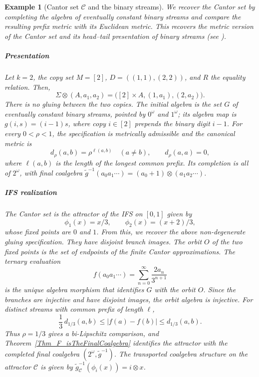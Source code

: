 \documentclass{sn-jnl}%
\theoremstyle{thmstyleone}%
\theoremstyle{thmstyletwo}%
\newtheorem{example}{Example}%
\theoremstyle{thmstylethree}%
\newcommand{\M}{\Sigma}
\newcommand{\F}{\M\otimes}
\newcommand{\g}{\tilde{g}^{-1}}
\newcommand{\f}{\phi}
\begin{document}
\begin{example}[Cantor set $\mathcal C$ and the binary streams]
\label{Ex_CantorSet}
    We recover the Cantor set by completing the algebra of eventually constant binary streams and compare the resulting prefix metric with its Euclidean metric. This recovers the metric version of the Cantor set and its head--tail presentation of binary streams (see \cite[Example~10.1]{Lein}).

    \subparagraph{Presentation}  Let $k=2$, the copy set $M=[2]$, $D=((1,1),(2,2))$, and $R$ the equality relation. Then,
    \begin{equation} 
    \nonumber
        \F(A,a_1,a_2) = \bigl([2]\times A,(1,a_1),(2,a_2)\bigr).
    \end{equation}
    There is no gluing between the two copies. The initial algebra is the set $G$ of eventually constant binary streams, pointed by $0^\omega$ and $1^\omega$; its algebra map is $g(i,s)=(i-1)s$, where copy $i\in[2]$ prepends the binary digit $i-1$. For every $0<\rho<1$, the specification is metrically admissible and the canonical metric is
    \begin{equation} 
    \nonumber
        d_\rho(a,b)=\rho^{\ell(a,b)}\quad(a\ne b), \qquad d_\rho(a,a)=0,
    \end{equation}
    where $\ell(a,b)$ is the length of the longest common prefix.     Its completion is all of $2^\omega$, with final coalgebra $\g(a_0a_1\cdots)=(a_0+1)\otimes(a_1a_2\cdots)$.
    
    \subparagraph{IFS realization} The Cantor set is the attractor of the IFS on $[0,1]$ given by 
    \begin{equation} 
    \nonumber
        \f_1(x)=x/3,\qquad \f_2(x)=(x+2)/3,
    \end{equation}
    whose fixed points are $0$ and $1$. From this, we recover the above non-degenerate gluing specification. They have disjoint branch images. The orbit $O$ of the two fixed points is the set of endpoints of the finite Cantor approximations. The ternary evaluation
    \begin{equation}
    \label{eqn:TirnaryEvaluation_Cantor}
        f(a_0a_1\cdots)=\sum_{n=0}^\infty\frac{2a_n}{3^{n+1}}
    \end{equation}
    is the unique algebra morphism that identifies $G$ with the orbit $O$. Since the branches are injective and have disjoint images, the orbit algebra is injective.     For distinct streams with common prefix of length $\ell$,
    \begin{equation} 
    \nonumber
        \frac13\,d_{1/3}(a,b) \leq |f(a)-f(b)| \leq d_{1/3}(a,b).
    \end{equation}
    Thus $\rho=1/3$ gives a bi-Lipschitz comparison, and     Theorem~\ref{Thm_F_isTheFinalCoalgebra} identifies the attractor     with the completed final coalgebra $(2^\omega, \g)$. The transported coalgebra structure on the attractor $\mathcal C$ is given by $\g_{\mathcal C}(\f_i(x))=i\otimes x$.
    

\end{example}
\end{document}
